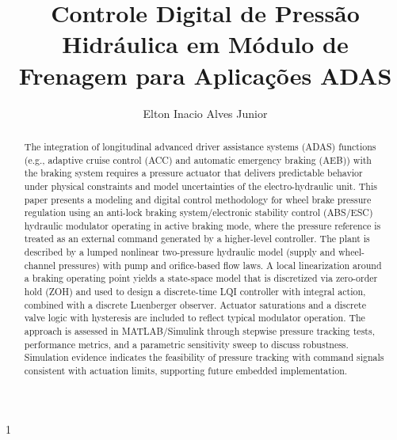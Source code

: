 \documentclass[a4paper]{ifacconf}
\def\portugues{1}
\def\portugues{0}
\begin{document}
\if\portugues1


   \begin{frontmatter}

      \title{Controle Digital de Pressão Hidráulica em Módulo de Frenagem para Aplicações ADAS}



      \author[First]{Elton Inacio Alves Junior}

      \address[First]{Departamento de Engenharia de Sistemas Eletrônicos, Universidade De São Paulo - USP.}


      \renewcommand{\abstractname}{{\bf Abstract:~}}
      \begin{abstract}                %
         The integration of longitudinal advanced driver assistance systems (ADAS) functions (e.g., adaptive cruise control (ACC) and automatic emergency braking (AEB)) with the braking system requires a pressure actuator that delivers predictable behavior under physical constraints and model uncertainties of the electro-hydraulic unit. This paper presents a modeling and digital control methodology for wheel brake pressure regulation using an anti-lock braking system/electronic stability control (ABS/ESC) hydraulic modulator operating in active braking mode, where the pressure reference is treated as an external command generated by a higher-level controller. The plant is described by a lumped nonlinear two-pressure hydraulic model (supply and wheel-channel pressures) with pump and orifice-based flow laws. A local linearization around a braking operating point yields a state-space model that is discretized via zero-order hold (ZOH) and used to design a discrete-time LQI controller with integral action, combined with a discrete Luenberger observer. Actuator saturations and a discrete valve logic with hysteresis are included to reflect typical modulator operation. The approach is assessed in MATLAB/Simulink through stepwise pressure tracking tests, performance metrics, and a parametric sensitivity sweep to discuss robustness. Simulation evidence indicates the feasibility of pressure tracking with command signals consistent with actuation limits, supporting future embedded implementation.


\end{abstract}
\end{frontmatter}
\end{document}
